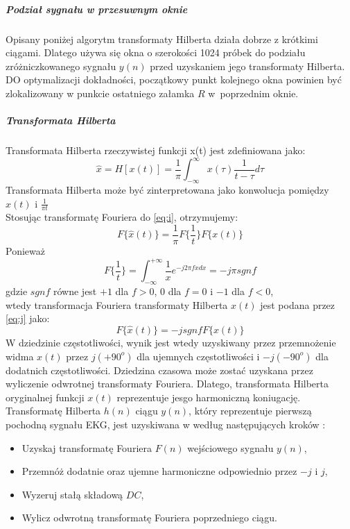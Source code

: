 \documentclass[a4paper, 11pt]{article}
\begin{document}
\subparagraph{Podział sygnału w przesuwnym oknie}
Opisany poniżej algorytm transformaty Hilberta działa dobrze z krótkimi ciągami. Dlatego używa się okna o szerokości 1024 próbek do podziału zróżniczkowanego sygnału $y(n)$ przed uzyskaniem jego transformaty Hilberta. DO optymalizacji dokładności, początkowy punkt kolejnego okna powinien być zlokalizowany w punkcie ostatniego załamka $R$ w~poprzednim oknie. 
\subparagraph{Transformata Hilberta}
Transformata Hilberta rzeczywistej funkcji x(t) jest zdefiniowana jako:
\begin{equation}
\hat{x}=H[x(t)]=\frac{1}{\pi}\int_{-\infty}^\infty x(\tau)\frac{1}{t -\tau}d\tau \label{eq:i}
\end{equation}
Transformata Hilberta może być zinterpretowana jako konwolucja pomiędzy $x(t)$ i $\frac{1}{\pi t}$\\
Stosując transformatę Fouriera do \eqref{eq:i}, otrzymujemy:
\begin{equation}
F\lbrace \hat{x}(t)\rbrace= \frac{1}{\pi} F \lbrace \frac{1}{t} \rbrace F \lbrace x(t) \rbrace \label{eq:j}
\end{equation}
Ponieważ 
\begin{equation}
F\lbrace \frac{1}{t} \rbrace = \int_{-\infty}^{+\infty} \frac{1}{x} e^{-j 2 \pi fxdx} = -j \pi sgn f  \label{eq:k}
\end{equation}
gdzie $sgn f$ równe jest $+1$ dla $f > 0$, $0$ dla $f = 0$ i $-1$ dla $f<0$,\\
wtedy transformacja Fouriera transformaty Hilberta $x(t)$ jest podana przez \eqref{eq:j} jako:
\begin{equation}
F \lbrace \hat{x}(t) \rbrace= -j sgn f F \lbrace x(t) \rbrace \label{eq:l}
\end{equation}
W dziedzinie częstotliwości, wynik jest wtedy uzyskiwany przez przemnożenie widma $x(t)$ przez $j(+90^o)$ dla ujemnych częstotliwości i $-j(-90^o)$ dla dodatnich częstotliwości. Dziedzina czasowa może zostać uzyskana przez wyliczenie odwrotnej transformaty Fouriera. Dlatego, transformata Hilberta oryginalnej funkcji $x(t)$ reprezentuje jesgo harmoniczną koniugację.\\
Transformatę Hilberta $h(n)$ ciągu $y(n)$, który reprezentuje pierwszą pochodną sygnału EKG, jest uzyskiwana w według następujących kroków :
\begin{itemize}
		\item Uzyskaj transformatę Fouriera $F(n)$ wejściowego sygnału $y(n)$,
		\item Przemnóż dodatnie oraz ujemne harmoniczne odpowiednio przez $-j$ i $j$,
		\item Wyzeruj stałą składową $DC$,
		\item Wylicz odwrotną transformatę Fouriera poprzedniego ciągu.
\end{itemize}
\end{document}
